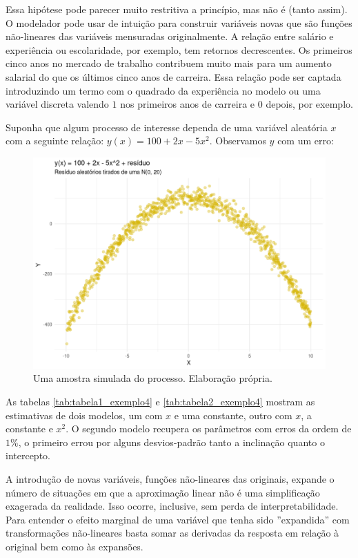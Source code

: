 Essa hipótese pode parecer muito restritiva a princípio, mas não é (tanto assim). O modelador pode usar de intuição para construir variáveis novas que são funções não-lineares das variáveis mensuradas originalmente. A relação entre salário e experiência ou escolaridade, por exemplo, tem retornos decrescentes. Os primeiros cinco anos no mercado de trabalho contribuem muito mais para um aumento salarial do que os últimos cinco anos de carreira. Essa relação pode ser captada introduzindo um termo com o quadrado da experiência no modelo ou uma variável discreta valendo $1$ nos primeiros anos de carreira e $0$ depois, por exemplo. 

\begin{exemplo}

Suponha que algum processo de interesse dependa de uma variável aleatória $x$ com a seguinte relação: $y(x) = 100 + 2x - 5x^2$. Observamos $y$ com um erro:

\begin{figure}[H]
    \centering
    \includegraphics[scale = .75]{imagens/exemplo4_dist.png}
    \caption{Uma amostra simulada do processo. Elaboração própria.}
\end{figure}

As tabelas \ref{tab:tabela1_exemplo4} e \ref{tab:tabela2_exemplo4} mostram as estimativas de dois modelos, um com $x$ e uma constante, outro com $x$, a constante e $x^2$. O segundo modelo recupera os parâmetros com erros da ordem de $1\%$, o primeiro errou por alguns desvios-padrão tanto a inclinação quanto o intercepto. 




A introdução de novas variáveis, funções não-lineares das originais, expande o número de situações em que a aproximação linear não é uma simplificação exagerada da realidade. Isso ocorre, inclusive, sem perda de interpretabilidade. Para entender o efeito marginal de uma variável que tenha sido ''expandida'' com transformações não-lineares basta somar as derivadas da resposta em relação à original bem como às expansões.


\end{exemplo}

